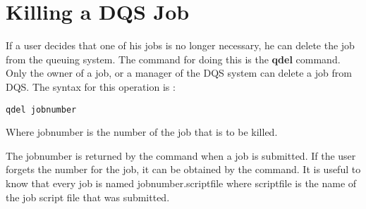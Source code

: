\section{Killing a DQS Job}

If a user decides that one of his jobs is no longer necessary, he can
delete the job from the queuing system.  The command for doing this is
the {\bf qdel} command.  Only the owner of a job, or a manager of the
DQS system can delete a job from DQS.  The syntax for this operation
is :
\begin{verbatim}
qdel jobnumber
\end{verbatim}
Where jobnumber is the number of the job that is to be killed.

The jobnumber is returned by the \qsub command when a job is submitted.  If
the user forgets the number for the job, it can be obtained by the \qstat
command.  It is useful to know that every job is named jobnumber.scriptfile
where scriptfile is the name of the job script file that was submitted.
